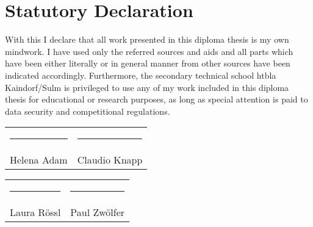 \chapter*{Statutory Declaration}
With this I declare that all work presented in this diploma thesis is my own mindwork. I have used only the referred sources and aids and all parts which have been either literally or in general manner from other sources have been indicated accordingly.
\newline \newline
Furthermore, the secondary technical school \gls{htbla} Kaindorf/Sulm is privileged to use any of my work included in this diploma thesis for educational or research purposes, as long as special attention is paid to data security and competitional regulations.
\par\bigskip

\par\bigskip

\par\bigskip

\par\bigskip

\par\bigskip

\par\bigskip

\par\bigskip

\par\bigskip

\par\bigskip

\par\bigskip

\par\bigskip

\par\bigskip

\begin{tabular}{p{7cm}p{7cm}}
\rule{6cm}{0.4pt} & \rule{6cm}{0.4pt}\\
Helena Adam & Claudio Knapp
\end{tabular}

\par\bigskip

\par\bigskip

\par\bigskip

\par\bigskip

\par\bigskip

\par\bigskip

\begin{tabular}{p{7cm}p{7cm}}
\rule{6cm}{0.4pt} & \rule{6cm}{0.4pt}\\
Laura Rössl & Paul Zwölfer
\end{tabular}


